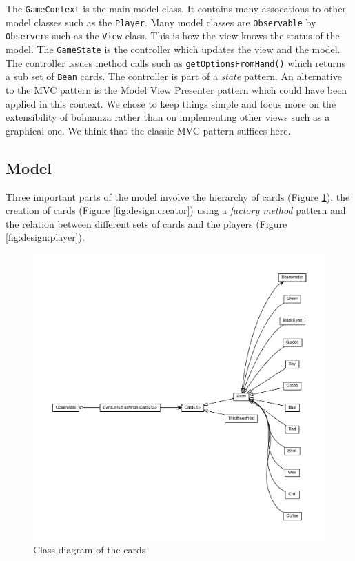 The \texttt{GameContext} is the main model class. It contains many assocations to other model classes such as the \texttt{Player}. Many
model classes are \texttt{Observable} by \texttt{Observer}s such as the \texttt{View} class. This is how the view knows the status of the
model. The \texttt{GameState} is the controller which updates the view and the model. The controller issues method calls such as
\texttt{getOptionsFromHand()} which returns a sub set of \texttt{Bean} cards. The controller is part of a \emph{state} pattern. An
alternative to the MVC pattern is the Model View Presenter pattern which could have been applied in this context. We chose to keep things
simple and focus more on the extensibility of bohnanza rather than on implementing other views such as a graphical one. We think that the
classic MVC pattern suffices here.
 
\subsection{Model}
Three important parts of the model involve the hierarchy of cards (Figure \ref{fig:design:cards}),
the creation of cards (Figure \ref{fig:design:creator}) using a \emph{factory method} pattern and
the relation between different sets of cards and the players (Figure \ref{fig:design:player}). 

 \begin{figure}[h!]
    \includegraphics[width=\textwidth]{../umlgraph/CardGraph}
    \caption{Class diagram of the cards}
    \label{fig:design:cards}
\end{figure}

